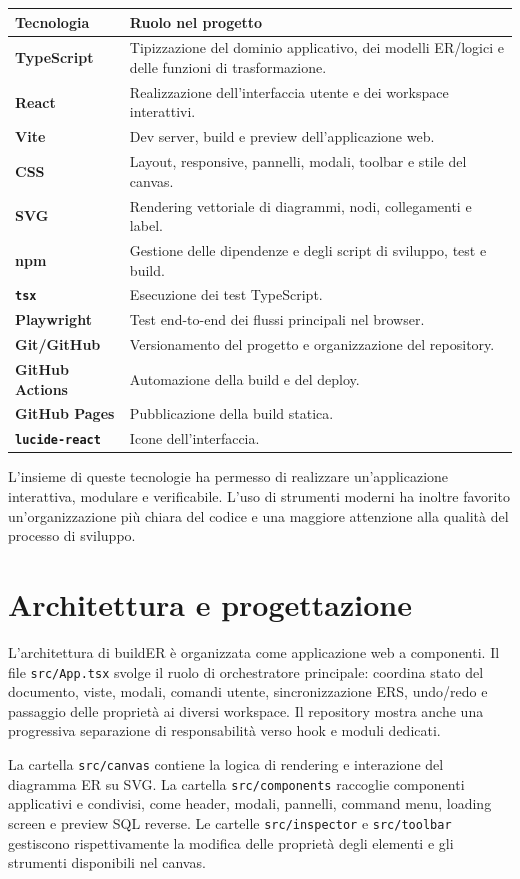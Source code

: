 \documentclass{unipd-thesis-modern}
\newcommand{\builder}{buildER}
\begin{document}
\noindent\begin{tabularx}{\textwidth}{>{\bfseries}p{3.5cm}X}
Tecnologia & Ruolo nel progetto \\
\hline
TypeScript & Tipizzazione del dominio applicativo, dei modelli ER/logici e delle funzioni di trasformazione. \\
React & Realizzazione dell'interfaccia utente e dei workspace interattivi. \\
Vite & Dev server, build e preview dell'applicazione web. \\
CSS & Layout, responsive, pannelli, modali, toolbar e stile del canvas. \\
SVG & Rendering vettoriale di diagrammi, nodi, collegamenti e label. \\
npm & Gestione delle dipendenze e degli script di sviluppo, test e build. \\
\texttt{tsx} & Esecuzione dei test TypeScript. \\
Playwright & Test end-to-end dei flussi principali nel browser. \\
Git/GitHub & Versionamento del progetto e organizzazione del repository. \\
GitHub Actions & Automazione della build e del deploy. \\
GitHub Pages & Pubblicazione della build statica. \\
\texttt{lucide-react} & Icone dell'interfaccia. \\
\end{tabularx}

L'insieme di queste tecnologie ha permesso di realizzare un'applicazione interattiva, modulare e verificabile. L'uso di strumenti moderni ha inoltre favorito un'organizzazione più chiara del codice e una maggiore attenzione alla qualità del processo di sviluppo.

\chapter{Architettura e progettazione}

L'architettura di \builder{} è organizzata come applicazione web a componenti. Il file \texttt{src/App.tsx} svolge il ruolo di orchestratore principale: coordina stato del documento, viste, modali, comandi utente, sincronizzazione ERS, undo/redo e passaggio delle proprietà ai diversi workspace. Il repository mostra anche una progressiva separazione di responsabilità verso hook e moduli dedicati.

La cartella \texttt{src/canvas} contiene la logica di rendering e interazione del diagramma ER su SVG. La cartella \texttt{src/components} raccoglie componenti applicativi e condivisi, come header, modali, pannelli, command menu, loading screen e preview SQL reverse. Le cartelle \texttt{src/inspector} e \texttt{src/toolbar} gestiscono rispettivamente la modifica delle proprietà degli elementi e gli strumenti disponibili nel canvas.
\end{document}
